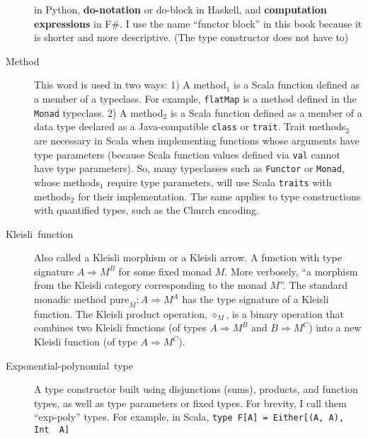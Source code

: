\begin{description}
in Python, \textbf{do-notation} or do-block
in Haskell, and \textbf{computation expressions}
in F\#. I use the name ``functor block'' in this book because it
is shorter and more descriptive. (The type constructor does not have
to)
\item [{\index{method}Method}] This word is used in two ways: 1) A method$_{1}$
is a Scala function defined as a member of a typeclass. For example,
\lstinline!flatMap! is
a method defined in the \lstinline!Monad!
typeclass. 2) A method$_{2}$ is a Scala function defined as a member
of a data type declared as a Java-compatible \lstinline!class!
or \lstinline!trait!. Trait
methods$_{2}$ are necessary in Scala when implementing functions
whose arguments have type parameters (because Scala function values
defined via \lstinline!val!
cannot have type parameters). So, many typeclasses such as \lstinline!Functor!
or \lstinline!Monad!, whose
methods$_{1}$ require type parameters, will use Scala \lstinline!traits!
with methods$_{2}$ for their implementation. The same applies to
type constructions with quantified types, such as the Church encoding. 
\item [{\index{Kleisli function}Kleisli~function}] Also called a Kleisli
morphism or a Kleisli
arrow. A function with type signature $A\Rightarrow M^{B}$ for some
fixed monad $M$. More verbosely, ``a morphism from the Kleisli category
corresponding to the monad $M$''. The standard monadic method $\text{pure}_{M}:A\Rightarrow M^{A}$
has the type signature of a Kleisli function. The Kleisli product
operation, $\diamond_{M}$, is a binary operation that combines two
Kleisli functions (of types $A\Rightarrow M^{B}$ and $B\Rightarrow M^{C}$)
into a new Kleisli function (of type $A\Rightarrow M^{C}$).
\item [{\index{exponential-polynomial type}Exponential-polynomial~type}] A
type constructor built using disjunctions (sums), products, and function
types, as well as type parameters or fixed types. For brevity, I call
them ``exp-poly'' types. For example, in Scala, \lstinline!type F[A] = Either[(A, A), Int  A]!

\end{description}
